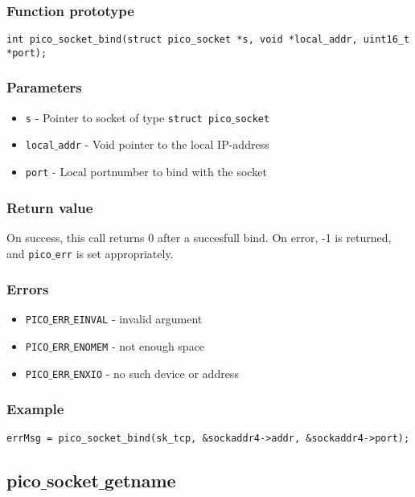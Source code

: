 \subsubsection*{Function prototype}
\begin{verbatim}
int pico_socket_bind(struct pico_socket *s, void *local_addr, uint16_t *port);
\end{verbatim}


\subsubsection*{Parameters}
\begin{itemize}[noitemsep]
\item \texttt{s} - Pointer to socket of type \texttt{struct pico$\_$socket}
\item \texttt{local$\_$addr} - Void pointer to the local IP-address
\item \texttt{port} - Local portnumber to bind with the socket
\end{itemize}

\subsubsection*{Return value}
On success, this call returns 0 after a succesfull bind.
On error, -1 is returned, and \texttt{pico$\_$err} is set appropriately.

\subsubsection*{Errors}
\begin{itemize}[noitemsep]
\item \texttt{PICO$\_$ERR$\_$EINVAL} - invalid argument
\item \texttt{PICO$\_$ERR$\_$ENOMEM} - not enough space
\item \texttt{PICO$\_$ERR$\_$ENXIO} - no such device or address
\end{itemize}

\subsubsection*{Example}
\begin{verbatim}
errMsg = pico_socket_bind(sk_tcp, &sockaddr4->addr, &sockaddr4->port);
\end{verbatim}

\subsection{pico$\_$socket$\_$getname}

